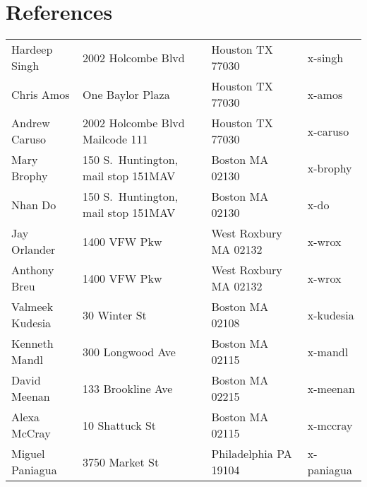 \documentclass[10pt]{article}
\begin{document}
\section*{References}
\begin{tabular}{llll}

Hardeep Singh & 2002 Holcombe Blvd              & Houston TX 77030 & x-singh\\
Chris Amos    & One Baylor Plaza                & Houston TX 77030 & x-amos\\
Andrew Caruso & 2002 Holcombe Blvd Mailcode 111 & Houston TX 77030 & x-caruso\\

Mary Brophy & 150 S.\ Huntington, mail stop 151MAV & Boston MA 02130 & x-brophy\\
Nhan Do     & 150 S.\ Huntington, mail stop 151MAV & Boston MA 02130 & x-do\\

Jay Orlander    & 1400 VFW Pkw      & West Roxbury MA 02132 & x-wrox\\
Anthony Breu    & 1400 VFW Pkw      & West Roxbury MA 02132 & x-wrox\\
Valmeek Kudesia & 30 Winter St      & Boston MA 02108       & x-kudesia\\
Kenneth Mandl   & 300 Longwood Ave  & Boston MA 02115       & x-mandl\\
David Meenan    & 133 Brookline Ave & Boston MA 02215       & x-meenan\\
Alexa McCray    & 10 Shattuck St    & Boston MA 02115       & x-mccray\\
Miguel Paniagua & 3750 Market St    & Philadelphia PA 19104 & x-paniagua
\end{tabular}
\end{document}
